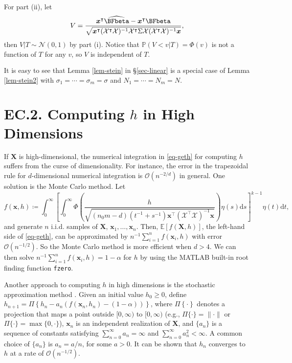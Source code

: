 \documentclass[ijoc,nonblindrev]{informs3}
\def\E{\mathbb{E}}
\def\pr{\mathbb{P}}
\def\ud{\mathrm{d}}
\def\bx{{\bm x}}
\def\bX{{\bm X}}
\def\cN{{\mathcal N}}
\def\cX{{\mathcal X}}
\begin{document}
For part (ii),  let
\[V=\frac{\bx^\intercal \widehat{\BFbeta} - \bx^\intercal \BFbeta}{\sqrt{\bx^\intercal (\cX^\intercal \cX)^{-1} \cX^\intercal \Sigma \cX (\cX^\intercal \cX)^{-1} \bx}},\]
then $V|T \sim \cN(0,1)$ by part (i). Notice that $\pr (V<v|T)=\Phi(v)$ is not a function of $T$ for any $v$, so $V$ is independent of $T$.
 \Halmos
\endproof


\begin{remark}
It is easy to see that Lemma \ref{lem-stein} in \S \ref{sec-linear} is a special case of Lemma \ref{lem-stein2} with $\sigma_1 = \cdots = \sigma_m = \sigma$ and $N_1 = \cdots = N_m = N$.
\end{remark}


\hypertarget{EC.2}{
\section*{EC.2. \hspace{5pt} Computing $h$ in High Dimensions}
}

If $\bX$ is high-dimensional, the numerical integration in \eqref{eq-geth} for computing $h$ suffers from the curse of dimensionality. For instance, the error in the trapezoidal rule for $d$-dimensional numerical integration is $\mathcal{O}(n^{-2/d})$ in general. One solution is the Monte Carlo method. Let
$$f(\bx,h) \coloneqq \int_0^\infty \left[\int_0^\infty \Phi \left( \frac{h}{\sqrt{(n_0m-d) (t^{-1}+s^{-1})\bx^\intercal (\cX^\intercal \cX)^{-1} \bx}} \right) \eta(s)\ud s \right]^{k-1} \eta(t) \ud t,$$
and generate $n$ i.i.d. samples of $\bX$, $\bx_1,\ldots,\bx_n$.
Then, $\E[f(\bX,h)]$, the left-hand side of \eqref{eq-geth}, can be approximated by $n^{-1}\sum_{i=1}^n f(\bx_i,h)$ with error $\mathcal{O}(n^{-1/2})$. So the Monte Carlo method is more efficient when $d>4$. We can then solve $n^{-1} \sum_{i=1}^n f(\bx_i,h) = 1-\alpha$ for $h$ by using the MATLAB built-in root finding function \texttt{fzero}.

Another approach to computing $h$ in high dimensions is the stochastic approximation method \citep{robbins1951stochastic_ec}.
Given an initial value $h_0\geq 0$, define
$h_{n+1} = \Pi \left\{ h_n - a_n (f(\bx_n,h_n) - (1-\alpha)) \right\}$, where $\Pi\left\{\cdot\right\}$ denotes a projection that maps a point outside $[0,\infty)$ to $[0,\infty)$ (e.g., $\Pi\{\cdot\}=\|\cdot\|$ or $\Pi\{\cdot\}=\max\{0,\cdot\}$),
$\bx_n$ is an independent realization of $\bX$, and $\{a_n\}$ is a sequence of constants satisfying $\sum_{n=0}^\infty a_n = \infty$ and $\sum_{n=0}^\infty a_n^2 < \infty$.
A common choice of $\{a_n\}$ is $a_n = a/n$, for some $a>0$. It can be shown that $h_n$ converges to $h$ at a rate of $\mathcal{O}(n^{-1/2})$.
\end{document}
